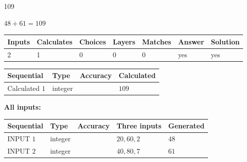 \documentclass[12pt]{article}
\begin{document}
 
 
\noindent{}
 
 

109
 
 
\noindent{}
 
 

 
 
 
\noindent{}
 
 

$ %
48 +  %
61=   %
109$
 
 
\noindent{}
 
 

 
   
   
   
   
\noindent\begin{tabular}{|l|l|l|l|l|l|l|}
 \hline
Inputs & Calculates & Choices & Layers & Matches & Answer & Solution \\ \hline
 2  & 
 1  & 
 0
  & 
 0  & 
 0  & 
  yes & 
  yes 
  \\ \hline
 \end{tabular}
   
   
   
   
\noindent{}
   
   
  
  
\noindent\begin{tabular}{|l|l|l|l|}
\hline
 Sequential & Type & Accuracy & Calculated \\ 
\hline
 
 
  Calculated $  1 $ & integer &  & 
  $ 109 $ 
 \\  \hline  
 \end{tabular}
   
   
   
   
\noindent\vspace{0.1in}\hspace{-0.08in} {\textbf{\Large{All inputs: }}}
   
   
  
  
\noindent\begin{tabular}{|l|l|l|l|l|}
\hline
 Sequential & Type & Accuracy & Three inputs & Generated \\ 
\hline
 
 
  INPUT $  1 $ & integer &  & $
 20
 , 
 60
 , 
 2
 $ & $ 48 $ 
 \\  \hline  
 
 
  INPUT $  2 $ & integer &  & $
 40
 , 
 80
 , 
 7
 $ & $ 61 $ 
 \\  \hline  
 \end{tabular}
   
\end{document}

